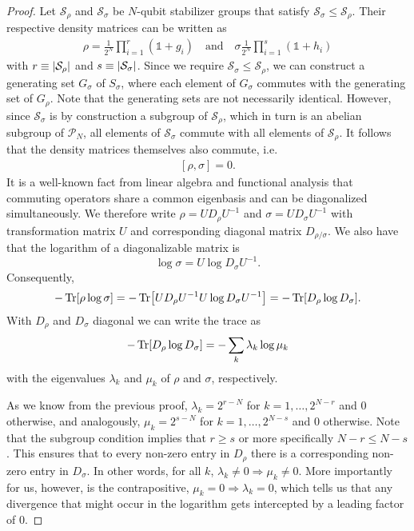 \begin{proof}
   Let $\mathcal{S}_\rho$ and $\mathcal{S}_\sigma$ be $N$-qubit stabilizer
   groups that satisfy $\mathcal{S}_\sigma \leq \mathcal{S}_\rho$. Their
   respective density matrices can be written as
   \begin{align}
     \rho = \frac{1}{2^N} \prod_{i=1}^r (\mathds{1} + g_i) \quad{\text{and}}
       \quad \sigma \frac{1}{2^N} \prod_{i=1}^s (\mathds{1} + h_i)
   \end{align}
   with $r \equiv \abs{\mathcal{S}_\rho}$ and $s \equiv
   \abs{\mathcal{S}_\sigma}$. Since we require $\mathcal{S}_\sigma \leq
   \mathcal{S}_\rho$, we can construct a generating set $G_\sigma$ of
   $S_\sigma$, where each element of $G_\sigma$ commutes with the generating
   set of $G_\rho$. Note that the generating sets are not necessarily
   identical. However, since $\mathcal{S}_\sigma$ is by construction a subgroup
   of $\mathcal{S}_\rho$, which in turn is an abelian subgroup of
   $\mathcal{P}_N$, all elements of $\mathcal{S}_\sigma$ commute with all elements of
   $\mathcal{S}_\rho$. It follows that the density matrices themselves also
   commute, i.e.
   \begin{align}
      \left[\rho, \sigma\right] = 0
   .\end{align}
   It is a well-known fact from linear algebra and functional analysis that
   commuting operators share a common eigenbasis and can be diagonalized
   simultaneously. We therefore write $\rho = UD_\rho U^{-1}$ and $\sigma =
   UD_\sigma U^{-1}$ with transformation matrix $U$ and corresponding diagonal
   matrix $D_{\rho / \sigma}$. We also have that the logarithm of a diagonalizable
   matrix is \cite{hallElementaryIntroductionGroups2000}
   $$\log \sigma = U \log D_\sigma U^{-1}.$$ Consequently,
   \begin{align}
      -\Tr[\rho \log\sigma] = -\Tr[U D_\rho U^{-1} U \log D_\sigma U^{-1}] =
      -\Tr[D_\rho \log D_\sigma] 
   .\end{align}
   With $D_\rho$ and $D_\sigma$ diagonal we can write the trace as
   \begin{align}\label{eq:the-sum}
      -\Tr[D_\rho \log D_\sigma] = -\sum_k \lambda_k \log \mu_k
   \end{align}
   with the eigenvalues $\lambda_k$ and $\mu_k$ of $\rho$ and $\sigma$,
   respectively.

   As we know from the previous proof, $\lambda_k = 2^{r-N}$ for
   $k=1,\ldots,2^{N-r}$ and $0$ otherwise, and analogously, $\mu_k = 2^{s-N}$
   for $k=1,\ldots,2^{N-s}$ and $0$ otherwise. Note that the subgroup condition
   implies that $r\geq s$ or more specifically $N-r \leq N-s$. This ensures that to every non-zero entry in
   $D_\rho$ there is a corresponding non-zero entry in $D_\sigma$. In other
   words, for all $k$, $\lambda_k \neq 0 \Rightarrow \mu_k \neq 0$. More
   importantly for us, however, is the contrapositive, $\mu_k = 0 \Rightarrow
   \lambda_k = 0$, which tells us that any divergence that might occur
   in the logarithm gets intercepted by a leading factor of $0$.


\end{proof}
